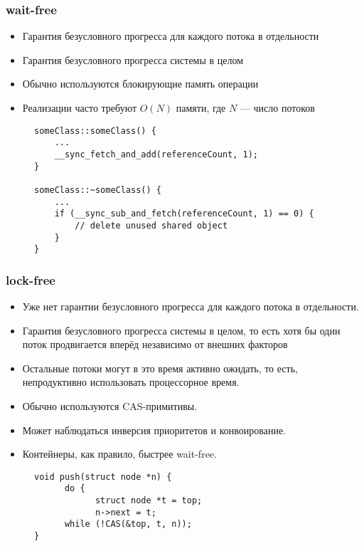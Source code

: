 \documentclass[aspectratio=169, pdf, 8pt, unicode]{beamer}
\begin{document}
\begin{frame}[fragile]
\frametitle{wait-free}
\begin{itemize}
\item Гарантия безусловного прогресса для каждого потока в отдельности
\item Гарантия безусловного прогресса системы в целом
\item Обычно используются блокирующие память операции
\item Реализации часто требуют $O(N)$ памяти, где $N$ — число потоков
\end{itemize}
\begin{figure}[H]
\centering
\begin{minipage}{0.8\textwidth}
\begin{verbatim}
someClass::someClass() {
    ...
    __sync_fetch_and_add(referenceCount, 1);
}

someClass::~someClass() {
    ...
    if (__sync_sub_and_fetch(referenceCount, 1) == 0) {
        // delete unused shared object
    }
}
\end{verbatim}
\end{minipage}
\end{figure}
\end{frame}

\begin{frame}[fragile]
\frametitle{lock-free}
\begin{itemize}
\item Уже нет гарантии безусловного прогресса для каждого потока в отдельности.
\item Гарантия безусловного прогресса системы в целом, то есть хотя бы один поток продвигается вперёд независимо от внешних факторов
\item Остальные потоки могут в это время активно ожидать, то есть, непродуктивно использовать процессорное время.
\item Обычно используются CAS-примитивы.
\item Может наблюдаться инверсия приоритетов и конвоирование.
\item Контейнеры, как правило, быстрее wait-free.
\end{itemize}
\begin{figure}[H]
\centering
\begin{minipage}{0.8\textwidth}
\begin{verbatim}
void push(struct node *n) {
      do {
            struct node *t = top;
            n->next = t;
      while (!CAS(&top, t, n));
}
\end{verbatim}
\end{minipage}
\end{figure}
\end{frame}
\end{document}
